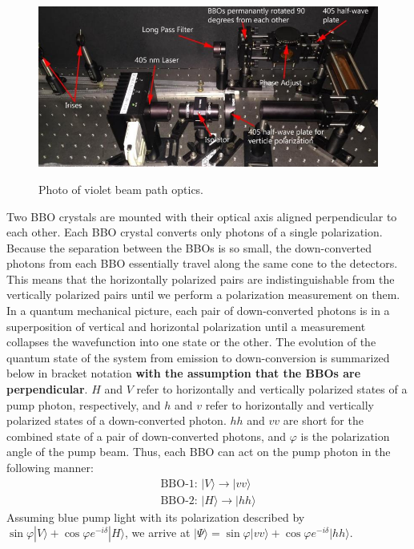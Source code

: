 \documentclass{../lab}
\begin{document}
\begin{figure}[h]
    \centering
    \href{http://experimentationlab.berkeley.edu/sites/default/files/qie_optics_image_0.jpg}{\includegraphics[width=0.7\linewidth]{images/qie_optics_image_0.jpg}}
    \caption{Photo of violet beam path optics.}
    \label{fig:qie_optics_image_0}
\end{figure}

Two BBO crystals are mounted with their optical axis aligned perpendicular to each other. Each BBO crystal converts only photons of a single polarization. Because the separation between the BBOs is so small, the down-converted photons from each BBO essentially travel along the same cone to the detectors. This means that the horizontally polarized pairs are indistinguishable from the vertically polarized pairs until we perform a polarization measurement on them. In a quantum mechanical picture, each pair of down-converted photons is in a superposition of vertical and horizontal polarization until a measurement collapses the wavefunction into one state or the other. The evolution of the quantum state of the system from emission to down-conversion is summarized below in bracket notation \textbf{with the assumption that the BBOs are perpendicular}. $H$ and $V$ refer to horizontally and vertically polarized states of a pump photon, respectively, and $h$ and $v$ refer to horizontally and vertically polarized states of a down-converted photon. $hh$ and $vv$ are short for the combined state of a pair of down-converted photons, and %
$\varphi$ is the polarization angle of the pump beam. Thus, each BBO can act on the pump photon in the following manner:
\begin{gather*}
    \text{BBO-1: } |V\rangle \rightarrow  |vv\rangle \\
    \text{BBO-2: } |H\rangle \rightarrow  |hh\rangle 
\end{gather*}
Assuming blue pump light with its polarization described by $\sin \varphi |V\rangle + \cos\varphi e^{-i\delta} |H\rangle$, we arrive at $|\Psi\rangle = \sin\varphi |vv\rangle + \cos\varphi e^{-i\delta} |hh\rangle$.
\end{document}
